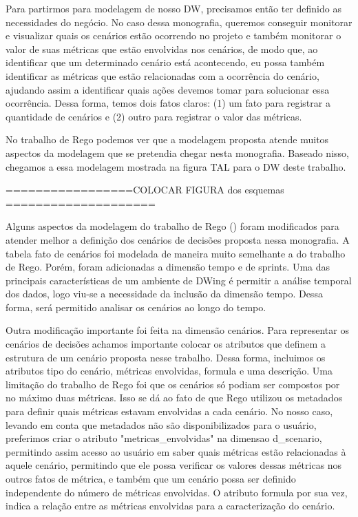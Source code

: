 Para partirmos para modelagem de nosso DW,  precisamos então ter definido as necessidades do negócio. No caso dessa monografia, queremos conseguir monitorar e visualizar quais os cenários estão ocorrendo no projeto e também monitorar o valor de suas métricas que estão envolvidas nos cenários, de modo que, ao identificar que um determinado cenário está acontecendo, eu possa também identificar as métricas que estão relacionadas com a ocorrência do cenário, ajudando assim a identificar quais ações devemos tomar para solucionar essa ocorrência. Dessa forma, temos dois fatos claros: (1) um fato para registrar a quantidade de cenários e (2) outro para registrar o valor das métricas.

No trabalho de Rego \citeyear{rego2014} podemos ver que a modelagem proposta atende muitos aspectos da modelagem que se pretendia chegar nesta monografia. Baseado nisso, chegamos a essa modelagem mostrada na figura TAL para o DW deste trabalho.

=================COLOCAR FIGURA dos esquemas ====================


Alguns aspectos da modelagem do trabalho de Rego (\citeyear{rego2014}) foram modificados para atender melhor a definição dos cenários de decisões proposta nessa monografia. A tabela fato de cenários foi modelada de maneira muito semelhante a do trabalho de Rego. Porém, foram adicionadas a dimensão tempo e de sprints. Uma das principais características de um ambiente de DWing é permitir a análise temporal dos dados, logo viu-se a necessidade da inclusão da dimensão tempo. Dessa forma, será permitido analisar os cenários ao longo do tempo. 

Outra modificação importante foi feita na dimensão cenários. Para representar os cenários de decisões achamos importante colocar os atributos que definem a estrutura de um cenário proposta nesse trabalho. Dessa forma, incluimos os atributos tipo do cenário, métricas envolvidas, formula e uma descrição. Uma limitação do trabalho de Rego foi que os cenários só podiam ser compostos por no máximo duas métricas. Isso se dá ao fato de que Rego utilizou os metadados para definir quais métricas estavam envolvidas a cada cenário. No nosso caso, levando em conta que  metadados não são disponibilizados para o usuário, preferimos criar o atributo "metricas\_envolvidas" na dimensao d\_scenario, permitindo assim acesso ao usuário em saber quais métricas estão relacionadas à aquele cenário, permitindo que ele possa verificar os valores dessas métricas nos outros fatos de métrica, e também que um cenário possa ser definido independente do número de métricas envolvidas. O atributo formula por sua vez, indica a relação entre as métricas envolvidas para a caracterização do cenário.



